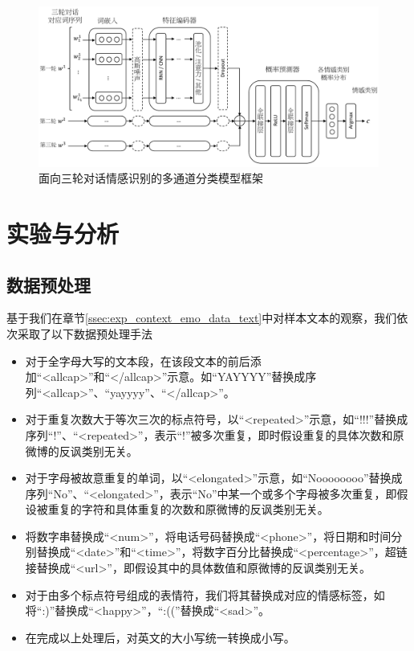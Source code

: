 \begin{figure}[H]
  \centering
  \includegraphics[width=\textwidth]{img/context_emo_cls_framework.pdf}
  \caption{面向三轮对话情感识别的多通道分类模型框架}
  \label{fig:context_emo_cls_framework}
\end{figure}

\section{实验与分析}
\label{sec:exp_context_emo_exp}

\subsection{数据预处理}

基于我们在章节\ref{ssec:exp_context_emo_data_text}中对样本文本的观察，我们依次采取了以下数据预处理手法

\begin{itemize}

\item 对于全字母大写的文本段，在该段文本的前后添加“<allcap>”和“</allcap>”示意。如“YAYYYY”替换成序列“<allcap>”、“yayyyy”、“</allcap>”。

\item 对于重复次数大于等次三次的标点符号，以“<repeated>”示意，如“!!!”替换成序列“!”、“<repeated>”，表示“!”被多次重复，即时假设重复的具体次数和原微博的反讽类别无关。

\item 对于字母被故意重复的单词，以“<elongated>”示意，如“Noooooooo”替换成序列“No”、“<elongated>”，表示“No”中某一个或多个字母被多次重复，即假设被重复的字符和具体重复的次数和原微博的反讽类别无关。

\item 将数字串替换成“<num>”，将电话号码替换成“<phone>”，将日期和时间分别替换成“<date>”和“<time>”，将数字百分比替换成“<percentage>”，超链接替换成“<url>”，即假设其中的具体数值和原微博的反讽类别无关。

\item 对于由多个标点符号组成的表情符，我们将其替换成对应的情感标签，如将“:)”替换成“<happy>”，“:((”替换成“<sad>”。

\item 在完成以上处理后，对英文的大小写统一转换成小写。

\end{itemize}

